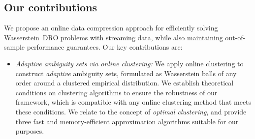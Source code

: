 \subsection{Our contributions}%
\label{c3:sub:our_contributions}
We propose an {\rm online data compression approach} for efficiently solving Wasserstein~\gls{DRO} problems with streaming data, while also maintaining out-of-sample performance guarantees.
Our key contributions are:
\begin{itemize}
    \item {\it Adaptive ambiguity sets via online clustering:} We apply online clustering to construct {\it adaptive} ambiguity sets, formulated as Wasserstein balls of any order around a clustered empirical distribution.
    We establish theoretical conditions on clustering algorithms to ensure the robustness of our framework, 
    which is compatible with any online clustering method that meets these conditions. 
    We relate to the concept of {\it optimal clustering},
     and provide  three  fast and memory-efficient  approximation algorithms suitable for our purposes. 
    

\end{itemize}
